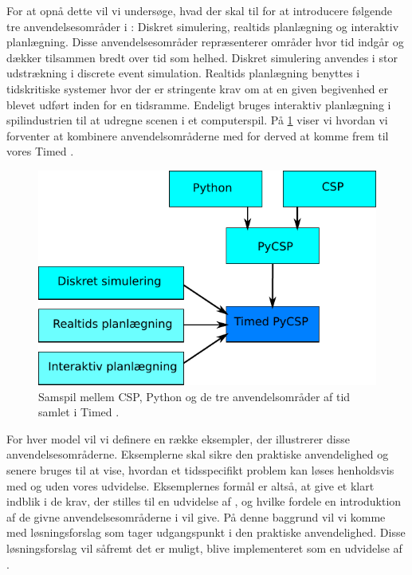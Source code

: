 For at opnå dette vil vi undersøge, hvad der skal til for at introducere følgende tre anvendelsesområder i \pycsp: Diskret simulering, realtids planlægning og interaktiv planlægning. Disse anvendelsesområder repræsenterer områder hvor tid indgår  og dækker tilsammen bredt over tid som helhed. Diskret simulering anvendes i stor udstrækning i discrete event simulation. Realtids planlægning benyttes i tidskritiske systemer hvor der er stringente krav om at en given begivenhed er blevet udført inden for en tidsramme. Endeligt bruges interaktiv planlægning i spilindustrien til at udregne scenen i et computerspil. På \cref{fig:intro} viser vi hvordan vi forventer at kombinere anvendelsområderne med \pycsp for derved at komme frem til vores Timed \pycsp. 

\begin{figure}[htp]
 \begin{center}
  \includegraphics[scale=0.8]{images/intro}
	\caption{Samspil mellem CSP, Python og de tre anvendelsområder af tid samlet i Timed \pycsp .}
	\label{fig:intro}
\end{center}
\end{figure}

For hver model vil vi definere en række eksempler, der illustrerer disse anvendelsesområderne. Eksemplerne skal sikre den praktiske anvendelighed og senere bruges til at vise, hvordan et tidsspecifikt problem kan løses henholdsvis med og uden vores udvidelse. Eksemplernes formål er altså, at give et klart indblik i de krav, der stilles til en udvidelse af \pycsp, og hvilke fordele en introduktion af de givne anvendelsesområderne i \pycsp vil give. På denne baggrund vil vi komme med løsningsforslag som tager udgangspunkt i den praktiske anvendelighed. Disse løsningsforslag vil såfremt det er muligt, blive implementeret som en udvidelse af \pycsp.

